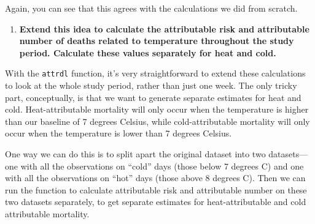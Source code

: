 \documentclass[
]{book}
\newenvironment{Shaded}{\begin{snugshade}}{\end{snugshade}}
\newcommand{\CommentTok}[1]{\textcolor[rgb]{0.56,0.35,0.01}{\textit{#1}}}
\newcommand{\DataTypeTok}[1]{\textcolor[rgb]{0.13,0.29,0.53}{#1}}
\newcommand{\DecValTok}[1]{\textcolor[rgb]{0.00,0.00,0.81}{#1}}
\newcommand{\KeywordTok}[1]{\textcolor[rgb]{0.13,0.29,0.53}{\textbf{#1}}}
\newcommand{\NormalTok}[1]{#1}
\newcommand{\OperatorTok}[1]{\textcolor[rgb]{0.81,0.36,0.00}{\textbf{#1}}}
\newcommand{\StringTok}[1]{\textcolor[rgb]{0.31,0.60,0.02}{#1}}
\providecommand{\tightlist}{%
  \setlength{\itemsep}{0pt}\setlength{\parskip}{0pt}}
\begin{document}
Again, you can see that this agrees with the calculations we did from scratch.

\begin{enumerate}
\def\labelenumi{\arabic{enumi}.}
\setcounter{enumi}{1}
\tightlist
\item
  \textbf{Extend this idea to calculate the attributable risk and attributable number of deaths related to temperature throughout the study period. Calculate these values separately for heat and cold.}
\end{enumerate}

With the \texttt{attrdl} function, it's very straightforward to extend these calculations to look at the whole study period, rather than just one week. The only tricky part, conceptually, is that we want to generate separate estimates for heat and cold. Heat-attributable mortality will only occur when the temperature is higher than our baseline of 7 degrees Celsius, while cold-attributable mortality will only occur when the temperature is lower than 7 degrees Celsius.

One way we can do this is to split apart the original dataset into two datasets---one with all the observations on ``cold'' days (those below 7 degrees C) and one with all the observations on ``hot'' days (those above 8 degrees C). Then we can run the function to calculate attributable risk and attributable number on these two datasets separately, to get separate estimates for heat-attributable and cold attributable mortality.

\begin{Shaded}
\end{Shaded}
\end{document}
